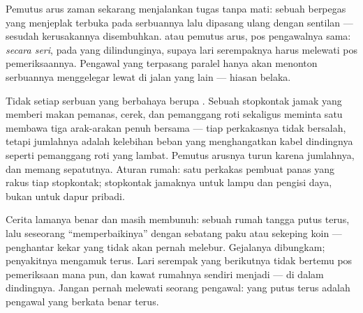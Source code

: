 \begin{example}\label{ex:g7:short-circuits-safety:breaker}
Pemutus arus zaman sekarang menjalankan tugas  tanpa mati:
sebuah  berpegas yang menjeplak terbuka pada serbuannya lalu
dipasang ulang dengan sentilan --- sesudah kerusakannya disembuhkan.
 atau pemutus arus, pos pengawalnya sama: \emph{secara seri},
pada  yang dilindunginya, supaya lari serempaknya harus melewati
pos pemeriksaannya. Pengawal yang terpasang paralel hanya akan
menonton serbuannya menggelegar lewat di jalan yang lain --- hiasan
belaka.
\end{example}

\begin{example}\label{ex:g7:short-circuits-safety:overload}
Tidak setiap serbuan yang berbahaya berupa . Sebuah
stopkontak jamak yang memberi makan pemanas, cerek, dan pemanggang roti
sekaligus meminta satu  membawa tiga arak-arakan penuh
bersama --- tiap perkakasnya tidak bersalah, tetapi jumlahnya adalah
kelebihan beban yang menghangatkan kabel dindingnya seperti pemanggang
roti yang lambat. Pemutus arusnya turun karena jumlahnya, dan memang
sepatutnya. Aturan rumah: satu perkakas pembuat panas yang rakus tiap
stopkontak; stopkontak jamaknya untuk lampu dan pengisi daya, bukan
untuk dapur pribadi.
\end{example}

\begin{remark}\label{rem:g7:short-circuits-safety:nail}
Cerita lamanya benar dan masih membunuh:  sebuah rumah tangga
putus terus, lalu seseorang ``memperbaikinya'' dengan sebatang paku
atau sekeping koin --- penghantar kekar yang tidak akan pernah
melebur. Gejalanya dibungkam; penyakitnya mengamuk terus. Lari serempak
yang berikutnya tidak bertemu pos pemeriksaan mana pun, dan kawat
rumahnya sendiri menjadi  --- di dalam dindingnya. Jangan
pernah melewati seorang pengawal:  yang putus terus adalah
pengawal yang berkata benar terus.
\end{remark}

